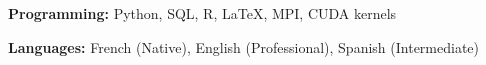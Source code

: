 \resumeSubHeadingListStart
\small{\item{
    \textbf{Programming:} {Python, SQL, R, \LaTeX, MPI, CUDA kernels} \\ \vspace{3pt}
    
    \textbf{Languages:} {French (Native), English (Professional), Spanish (Intermediate)}
}}
\resumeSubHeadingListEnd